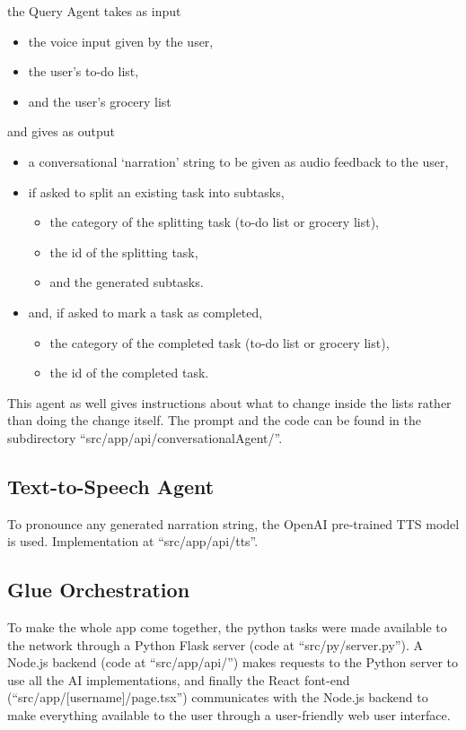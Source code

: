 \documentclass{article}
\begin{document}
the Query Agent takes as input
\begin{itemize}
  \item the voice input given by the user,
  \item the user's to-do list,
  \item and the user's grocery list
\end{itemize}
and gives as output
\begin{itemize}
  \item a conversational `narration' string to be given as audio feedback to the user,
  \item if asked to split an existing task into subtasks,
  \begin{itemize}
    \item the category of the splitting task (to-do list or grocery list),
    \item the id of the splitting task,
    \item and the generated subtasks.
  \end{itemize}
  \item and, if asked to mark a task as completed,
  \begin{itemize}
    \item the category of the completed task (to-do list or grocery list),
    \item the id of the completed task.
  \end{itemize}
\end{itemize}

This agent as well gives instructions about what to change inside the lists rather than doing the change itself. The prompt and the code can be found in the subdirectory ``src/app/api/conversationalAgent/''.


\subsection*{\color{draculayellow}Text-to-Speech Agent}

To pronounce any generated narration string, the OpenAI pre-trained TTS model is used. Implementation at ``src/app/api/tts''.

\subsection*{\color{draculagreen}Glue Orchestration}

To make the whole app come together, the python tasks were made available to the network through a Python Flask server (code at ``src/py/server.py''). A Node.js backend (code at ``src/app/api/'') makes requests to the Python server to use all the AI implementations, and finally the React font-end (``src/app/[username]/page.tsx'') communicates with the Node.js backend to make everything available to the user through a user-friendly web user interface.
\end{document}
